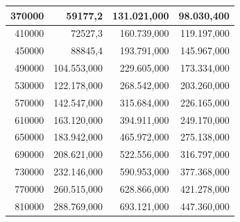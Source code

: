 \documentclass[a4paper, 12pt]{article}
\begin{document}
\begin{longtable}[c]{@{}rrrr@{}}
	\multicolumn{1}{|r|}{370000}                  & \multicolumn{1}{r|}{59177,2}           & \multicolumn{1}{r|}{131.021,000}         & \multicolumn{1}{r|}{98.030,400}        \\* \midrule
	\multicolumn{1}{|r|}{410000}                  & \multicolumn{1}{r|}{72527,3}           & \multicolumn{1}{r|}{160.739,000}         & \multicolumn{1}{r|}{119.197,000}       \\* \midrule
	\multicolumn{1}{|r|}{450000}                  & \multicolumn{1}{r|}{88845,4}           & \multicolumn{1}{r|}{193.791,000}         & \multicolumn{1}{r|}{145.967,000}       \\* \midrule
	\multicolumn{1}{|r|}{490000}                  & \multicolumn{1}{r|}{104.553,000}       & \multicolumn{1}{r|}{229.605,000}         & \multicolumn{1}{r|}{173.334,000}       \\* \midrule
	\multicolumn{1}{|r|}{530000}                  & \multicolumn{1}{r|}{122.178,000}       & \multicolumn{1}{r|}{268.542,000}         & \multicolumn{1}{r|}{203.260,000}       \\* \midrule
	\multicolumn{1}{|r|}{570000}                  & \multicolumn{1}{r|}{142.547,000}       & \multicolumn{1}{r|}{315.684,000}         & \multicolumn{1}{r|}{226.165,000}       \\* \midrule
	\multicolumn{1}{|r|}{610000}                  & \multicolumn{1}{r|}{163.120,000}       & \multicolumn{1}{r|}{394.911,000}         & \multicolumn{1}{r|}{249.170,000}       \\* \midrule
	\multicolumn{1}{|r|}{650000}                  & \multicolumn{1}{r|}{183.942,000}       & \multicolumn{1}{r|}{465.972,000}         & \multicolumn{1}{r|}{275.138,000}       \\* \midrule
	\multicolumn{1}{|r|}{690000}                  & \multicolumn{1}{r|}{208.621,000}       & \multicolumn{1}{r|}{522.556,000}         & \multicolumn{1}{r|}{316.797,000}       \\* \midrule
	\multicolumn{1}{|r|}{730000}                  & \multicolumn{1}{r|}{232.146,000}       & \multicolumn{1}{r|}{590.953,000}         & \multicolumn{1}{r|}{377.368,000}       \\* \midrule
	\multicolumn{1}{|r|}{770000}                  & \multicolumn{1}{r|}{260.515,000}       & \multicolumn{1}{r|}{628.866,000}         & \multicolumn{1}{r|}{421.278,000}       \\* \midrule
	\multicolumn{1}{|r|}{810000}                  & \multicolumn{1}{r|}{288.769,000}       & \multicolumn{1}{r|}{693.121,000}         & \multicolumn{1}{r|}{447.360,000}       \\* \midrule

\end{longtable}
\end{document}
